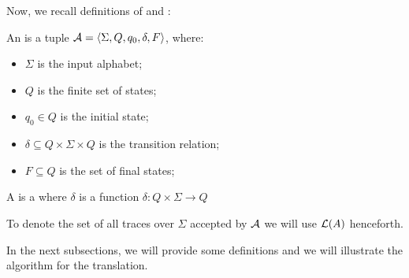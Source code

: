 Now, we recall definitions of \NFA and \DFA:
\begin{definition}\label{nfa}
An \NFA is a tuple $\mathcal{A} = \langle \Sigma, Q, q_0 , \delta, F \rangle$, where:
\begin{itemize}		
\item $\Sigma$ is the input alphabet;
\item $Q$ is the finite set of states;
\item $q_0 \in Q$ is the initial state;
\item $\delta \subseteq Q \times \Sigma \times Q$ is the transition relation;
\item $F \subseteq Q$ is the set of final states;
\end{itemize}
\end{definition}
\begin{definition}
A \DFA is a \NFA where $\delta$ is a function $\delta: Q \times \Sigma \to Q$
\end{definition}
To denote the set of all traces over $\Sigma$ accepted by $\mathcal{A}$ we will use $\mathcal{L}(A)$ henceforth.

In the next subsections, we will provide some definitions and we will illustrate the algorithm for the translation.
